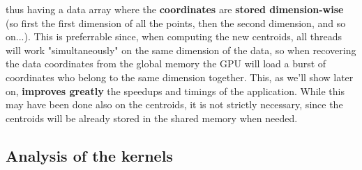 \documentclass[11pt, journal]{IEEEtran}
\newcommand{\nwl}{

\vspace{11pt}

}
\begin{document}
\begin{center}
\end{center}

\nwl
thus having a data array where the \textbf{coordinates} are \textbf{stored dimension-wise} (so first the first dimension of all the points, then the second dimension, and so on...). This is preferrable since, when computing the new centroids, all threads will work "simultaneously" on the same dimension of the data, so when recovering the data coordinates from the global memory the GPU will load a burst of coordinates who belong to the same dimension together. This, as we'll show later on, \textbf{improves greatly} the speedups and timings of the application. While this may have been done also on the centroids, it is not strictly necessary, since the centroids will be already stored in the shared memory when needed.

\subsection{Analysis of the kernels}
\end{document}

